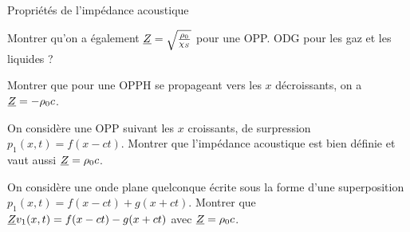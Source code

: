 \documentclass[12pt,fancy]{cours}
\begin{document}
%
%
\begin{exemple}{Propriétés de l’impédance acoustique}
	\begin{quest}
		\item	Montrer qu’on a également $\underline{Z}=\sqrt{\frac{\rho_0}{\chi_S}}$ pour une OPP. ODG pour les gaz et les liquides ?
		\item Montrer que pour une OPPH se propageant vers les $x$ décroissants, on a $\underline{Z} = - \rho_0 c$.
		\item On considère une OPP suivant les $x$ croissants, de surpression $p_1(x,t)=f(x-ct)$. Montrer que l’impédance acoustique est bien définie et vaut aussi $\underline{Z} = \rho_0 c$.
		\item On considère une onde plane quelconque écrite sous la  forme d’une superposition  $p_1(x,t)=f(x-ct)+g(x+ct)$. Montrer que 
		$\underline{Z} v_1(x,t)=f(x-ct)-g(x+ct)$  avec $\underline{Z} = \rho_0 c$.

	\end{quest}
\end{exemple}
\end{document}
